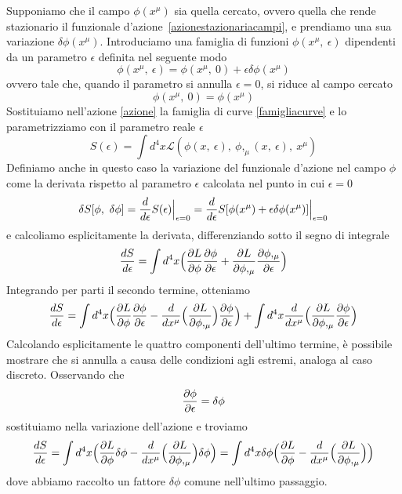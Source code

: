     Supponiamo che il campo $\phi(x^\mu)$ sia quella cercato, ovvero quella che rende stazionario il funzionale d'azione~\eqref{azionestazionariacampi}, e prendiamo una sua variazione $\delta \phi(x^\mu)$. Introduciamo una famiglia di funzioni $\phi(x^\mu, ~\epsilon)$ dipendenti da un parametro $\epsilon$ definita nel seguente modo 
    \begin{equation} \label{famigliacurvecampi}
        \phi(x^\mu, ~\epsilon) = \phi(x^\mu, ~0) + \epsilon \delta \phi(x^\mu)
    \end{equation}
    ovvero tale che, quando il parametro si annulla $\epsilon=0$, si riduce al campo cercato
    \begin{equation*}
        \phi(x^\mu, ~ 0) = \phi(x^\mu)
    \end{equation*}
    Sostituiamo nell'azione \eqref{azione} la famiglia di curve \eqref{famigliacurve} e lo parametrizziamo con il parametro reale $\epsilon$
    \begin{equation*}
        S(\epsilon) = \int d^4 x \mathcal L (\phi(x,~\epsilon),~\phi,_\mu(x, ~\epsilon),~x^\mu)
    \end{equation*}
    Definiamo anche in questo caso la variazione del funzionale d'azione nel campo $\phi$ come la derivata rispetto al parametro $\epsilon$ calcolata nel punto in cui $\epsilon = 0$
    \begin{equation} \label{variazioneazionecampi}
        \delta S[\phi, ~ \delta \phi] = \frac{d}{d\epsilon} S(\epsilon) \Big \vert_{\epsilon = 0} = \frac{d}{d\epsilon} S[\phi(x^\mu) + \epsilon \delta \phi(x^\mu)] \Big \vert_{\epsilon = 0}
    \end{equation}
    e calcoliamo esplicitamente la derivata, differenziando sotto il segno di integrale
\begin{equation*}
    \frac{dS}{d\epsilon} = \int d^4 x \Big (\frac{\partial L}{\partial\phi} \frac{\partial\phi}{\partial\epsilon} + \frac{\partial L}{\partial\phi,_\mu} \frac{\partial\phi,_\mu}{\partial\epsilon} \Big)
\end{equation*}\label{prova1campi}
    Integrando per parti il secondo termine, otteniamo
\begin{equation}
    \frac{dS}{d\epsilon} = \int d^4 x \Big (\frac{\partial L}{\partial\phi} \frac{\partial\phi}{\partial\epsilon} - \frac{d}{dx^\mu} \Big (\frac{\partial L}{\partial\phi,_\mu} \Big) \frac{\partial\phi}{\partial\epsilon} \Big) + \int d^4 x \frac{d}{dx^\mu} \Big ( \frac{\partial L}{\partial\phi,_\mu} \frac{\partial\phi}{\partial\epsilon} \Big )
\end{equation}
    Calcolando esplicitamente le quattro componenti dell'ultimo termine, è possibile mostrare che si annulla a causa delle condizioni agli estremi, analoga al caso discreto. Osservando che 
\begin{equation}
    \frac{\partial\phi}{\partial\epsilon} = \delta \phi
\end{equation}
    sostituiamo nella variazione dell'azione e troviamo
\begin{equation*}
    \frac{dS}{d\epsilon} = \int d^4 x \Big (\frac{\partial L}{\partial\phi} \delta \phi - \frac{d}{dx^\mu} \Big (\frac{\partial L}{\partial\phi,_\mu} \Big) \delta \phi \Big) = \int d^4 x \delta \phi \Big (\frac{\partial L}{\partial\phi} - \frac{d}{dx^\mu} \Big (\frac{\partial L}{\partial\phi,_\mu} \Big) \Big) 
\end{equation*}
    dove abbiamo raccolto un fattore $\delta \phi$ comune nell'ultimo passaggio.

